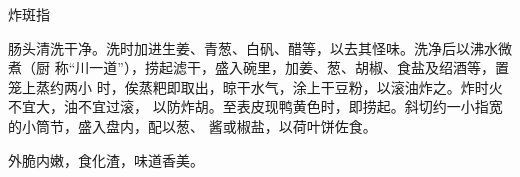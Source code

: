 \begin{recipe}{炸斑指}

\ingredients


\preparation

肠头清洗干净。洗时加进生姜、青葱、白矾、醋等，以去其怪味。洗净后以沸水微煮（厨
称“川一道”），捞起滤干，盛入碗里，加姜、葱、胡椒、食盐及绍酒等，置笼上蒸约两小
时，俟蒸粑即取出，晾干水气，涂上干豆粉，以滚油炸之。炸时火不宜大，油不宜过滚，
以防炸胡。至表皮现鸭黄色时，即捞起。斜切约一小指宽的小筒节，盛入盘内，配以葱、
酱或椒盐，以荷叶饼佐食。

\features

外脆内嫩，食化渣，味道香美。

\end{recipe}

